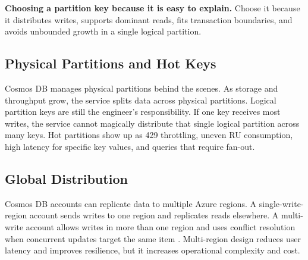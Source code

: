 \begin{pitfall}
\textbf{Choosing a partition key because it is easy to explain.} Choose it because it distributes writes, supports dominant reads, fits transaction boundaries, and avoids unbounded growth in a single logical partition.
\end{pitfall}

\subsection{Physical Partitions and Hot Keys}
Cosmos DB manages physical partitions behind the scenes. As storage and throughput grow, the service splits data across physical partitions. Logical partition keys are still the engineer's responsibility. If one key receives most writes, the service cannot magically distribute that single logical partition across many keys. Hot partitions show up as 429 throttling, uneven RU consumption, high latency for specific key values, and queries that require fan-out.

\subsection{Global Distribution}
Cosmos DB accounts can replicate data to multiple Azure regions. A single-write-region account sends writes to one region and replicates reads elsewhere. A multi-write account allows writes in more than one region and uses conflict resolution when concurrent updates target the same item \cite{microsoft2025cosmosGlobalDistribution}. Multi-region design reduces user latency and improves resilience, but it increases operational complexity and cost.

